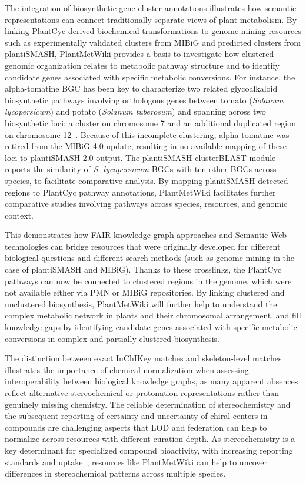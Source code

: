\documentclass[11pt,a4paper]{article}
\begin{document}
The integration of biosynthetic gene cluster annotations illustrates how semantic representations can
connect traditionally separate views of plant metabolism. By linking
PlantCyc-derived biochemical transformations to genome-mining resources such as experimentally validated clusters from MIBiG and predicted clusters from
plantiSMASH, PlantMetWiki provides a basis to investigate how clustered genomic organization relates to metabolic
pathway structure and to identify candidate genes associated with specific metabolic conversions. For instance, the alpha-tomatine
BGC has been key to characterize two related glycoalkaloid biosynthetic pathways involving
orthologous genes between tomato (\textit{Solanum lycopersicum}) and potato (\textit{Solanum
tuberosum}) and spanning across two biosynthetic loci: a cluster on chromosome 7 and an additional
duplicated region on chromosome 12~\cite{itkin2013}. Because of this incomplete clustering,
alpha-tomatine was retired from the MIBiG 4.0 update, resulting in no available mapping of these loci
to plantiSMASH 2.0 output. The plantiSMASH clusterBLAST module reports the similarity of \textit{S.
lycopersicum} BGCs with ten other BGCs across species, to facilitate comparative analysis. By mapping
plantiSMASH-detected regions to PlantCyc pathway annotations, PlantMetWiki facilitates further
comparative studies involving pathways across species, resources, and genomic context.

This demonstrates how FAIR knowledge graph approaches and Semantic Web
technologies can bridge resources that were originally developed for different biological questions
and different search methods (such as genome mining in the case of plantiSMASH and MIBiG). Thanks
to these crosslinks, the PlantCyc pathways can now be connected to clustered regions in the genome,
which were not available either via PMN or MIBiG repositories. By linking clustered and unclustered
biosynthesis, PlantMetWiki will further help to understand the complex metabolic network in plants and their chromosomal arrangement, and
fill knowledge gaps by identifying candidate genes associated with specific metabolic conversions in complex and partially clustered biosynthesis. 

The distinction between
exact InChIKey matches and skeleton-level matches illustrates the importance of chemical
normalization when assessing interoperability between biological knowledge graphs, as many apparent
absences reflect alternative stereochemical or protonation representations rather than genuinely
missing chemistry. The reliable determination of stereochemistry and the subsequent reporting of
certainty and uncertainty of chiral centers in compounds are challenging aspects that LOD and
federation can help to normalize across resources with different curation depth. As stereochemistry
is a key determinant for specialized compound bioactivity, with increasing reporting standards and
uptake~\cite{cicek2024}, resources like PlantMetWiki can help to uncover differences in stereochemical
patterns across multiple species.
\end{document}

